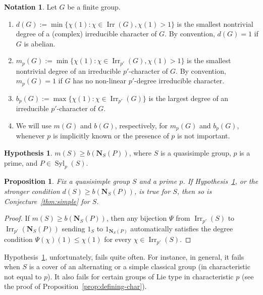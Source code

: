 \documentclass[12pt]{amsart}
\theoremstyle{plain}
\newtheorem{pro}[thm]{Proposition}
\theoremstyle{definition}
\newtheorem{notation}[thm]{Notation}
\newtheorem{hypothesis}[thm]{Hypothesis}
\numberwithin{equation}{section}
\newcommand{\Syl}{\operatorname{Syl}}
\newcommand{\Irr}{\operatorname{Irr}}
\newcommand{\bN}{\mathbf{N}}
\begin{document}
\begin{notation} Let $G$ be a finite group.
\begin{enumerate}[\rm(i)]
\item $d(G):=\min\{\chi(1):\chi\in\Irr(G), \chi(1)>1\}$ is the smallest nontrivial
degree of a (complex) irreducible character of $G$. By convention,
$d(G)=1$ if $G$ is abelian.
\item $m_p(G):=\min\{\chi(1):\chi\in\Irr_{p'}(G), \chi(1)>1\}$ is the smallest nontrivial
degree of an irreducible $p'$-character of $G$. By convention,
$m_p(G)=1$ if $G$ has no non-linear $p'$-degree irreducible
character.
\item $b_p(G):=\max\{\chi(1):\chi\in\Irr_{p'}(G)\}$ is the largest
degree of an irreducible $p'$-character of $G$.
\item We will use $m(G)$ and $b(G)$, respectively, for $m_p(G)$ and
$b_p(G)$, whenever $p$ is implicitly known or the presence of $p$ is
not important.
\end{enumerate}
\end{notation}

\begin{hypothesis}
\label{hypo} $m(S)\geq b(\bN_S(P))$, where $S$ is a quasisimple
group, $p$ is a prime, and $P\in\Syl_p(S)$.
\end{hypothesis}

\begin{pro}\label{pro:key}
Fix a quasisimple group $S$ and a prime $p$. If
Hypothesis~\ref{hypo}, or the stronger condition $d(S)\geq
b(\bN_S(P))$, is true for $S$, then so is
Conjecture~\ref{thm:simple} for $S$.
\end{pro}

\begin{proof}
If $m(S)\geq b(\bN_S(P))$, then any bijection $\Psi$ from
$\Irr_{p'}(S)$ to $\Irr_{p'}(\bN_S(P))$ sending $1_S$ to
$1_{\bN_S(P)}$ automatically satisfies the degree condition
$\Psi(\chi)(1)\leq\chi(1)$ for every $\chi\in \Irr_{p'}(S)$.
\end{proof}

Hypothesis~\ref{hypo}, unfortunately, fails quite often. For
instance, in general, it fails when $S$ is a cover of an alternating
or a simple classical group (in characteristic not equal to $p$). It
also fails for certain groups of Lie type in characteristic $p$ (see
the proof of Proposition~\ref{prop:defining-char}).



\end{document}
